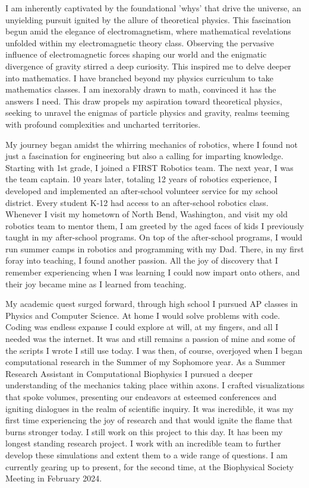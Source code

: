 \documentclass[a4paper, 12pt]{../../config/homework}
\begin{document}
\pagebreak
I am inherently captivated by the foundational 'whys' that drive the universe, an unyielding pursuit ignited by the allure of theoretical physics. This fascination begun amid the elegance of electromagnetism, where mathematical revelations unfolded within my electromagnetic theory class. Observing the pervasive influence of electromagnetic forces shaping our world and the enigmatic divergence of gravity stirred a deep curiosity. This inspired me to delve deeper into mathematics. I have branched beyond my physics curriculum to take mathematics classes. I am inexorably drawn to math, convinced it has the answers I need. This draw propels my aspiration toward theoretical physics, seeking to unravel the enigmas of particle physics and gravity, realms teeming with profound complexities and uncharted territories.

My journey began amidst the whirring mechanics of robotics, where I found not just a fascination for engineering but also a calling for imparting knowledge. Starting with 1st grade, I joined a FIRST Robotics team. The next year, I was the team captain. 10 years later, totaling 12 years of robotics experience, I developed and implemented an after-school volunteer service for my school district. Every student K-12 had access to an after-school robotics class. Whenever I visit my hometown of North Bend, Washington, and visit my old robotics team to mentor them, I am greeted by the aged faces of kids I previously taught in my after-school programs. On top of the after-school programs, I would run summer camps in robotics and programming with my Dad. There, in my first foray into teaching, I found another passion. All the joy of discovery that I remember experiencing when I was learning I could now impart onto others, and their joy became mine as I learned from teaching.

My academic quest surged forward, through high school I pursued AP classes in Physics and Computer Science. At home I would solve problems with code. Coding was endless expanse I could explore at will, at my fingers, and all I needed was the internet. It was and still remains a passion of mine and some of the scripts I wrote I still use today. I was then, of course, overjoyed when I began computational research in the Summer of my Sophomore year. As a Summer Research Assistant in Computational Biophysics I pursued a deeper understanding of the mechanics taking place within axons. I crafted visualizations that spoke volumes, presenting our endeavors at esteemed conferences and igniting dialogues in the realm of scientific inquiry. It was incredible, it was my first time experiencing the joy of research and that would ignite the flame that burns stronger today. I still work on this project to this day. It has been my longest standing research project. I work with an incredible team to further develop these simulations and extent them to a wide range of questions. I am currently gearing up to present, for the second time, at the Biophysical Society Meeting in February 2024.
\end{document}
